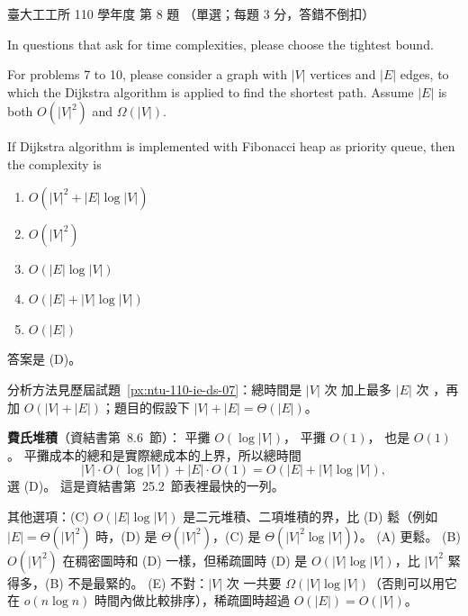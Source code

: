 \begin{pastexam}[label={px:ntu-110-ie-ds-08}]{臺大工工所 110 學年度 第 8 題}
（單選；每題 3 分，答錯不倒扣）

In questions that ask for time complexities, please choose the tightest bound.

For problems 7 to 10, please consider a graph with $|V|$ vertices and $|E|$ edges, to which the Dijkstra
algorithm is applied to find the shortest path. Assume $|E|$ is both $O(|V|^2)$ and $\Omega(|V|)$.

If Dijkstra algorithm is implemented with Fibonacci heap as priority queue, then the complexity is

\begin{enumerate}[label=(\Alph*)]
\item $O(|V|^2+|E|\log|V|)$
\item $O(|V|^2)$
\item $O(|E|\log|V|)$
\item $O(|E|+|V|\log|V|)$
\item $O(|E|)$
\end{enumerate}
\end{pastexam}

\begin{pastsoln}
答案是 (D)。

分析方法見歷屆試題~\ref{px:ntu-110-ie-ds-07}：總時間是 $|V|$ 次  加上最多 $|E|$ 次 ，再加 $O(|V| + |E|)$；題目的假設下 $|V| + |E| = \Theta(|E|)$。

\textbf{費氏堆積}（資結書第~8.6~節）： 平攤 $O(\log|V|)$， 平攤 $O(1)$，
 也是 $O(1)$。 平攤成本的總和是實際總成本的上界，所以總時間
\[
  |V| \cdot O(\log|V|) + |E| \cdot O(1) = O(|E| + |V|\log|V|) ,
\]
選 (D)。 這是資結書第~25.2~節表裡最快的一列。

其他選項：(C) $O(|E|\log|V|)$ 是二元堆積、二項堆積的界，比 (D) 鬆（例如 $|E| = \Theta(|V|^2)$ 時，(D) 是
$\Theta(|V|^2)$，(C) 是 $\Theta(|V|^2\log|V|)$）。 (A) 更鬆。 (B) $O(|V|^2)$ 在稠密圖時和 (D) 一樣，但稀疏圖時
(D) 是 $O(|V|\log|V|)$，比 $|V|^2$ 緊得多，(B) 不是最緊的。 (E) 不對：$|V|$ 次  一共要
$\Omega(|V|\log|V|)$（否則可以用它在 $o(n\log n)$ 時間內做比較排序），稀疏圖時超過 $O(|E|) = O(|V|)$。
\end{pastsoln}
